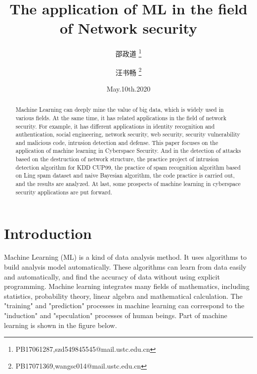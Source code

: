 \documentclass[UTF8]{article}
\title{ The application of ML in the field of Network security}
\author{邵政道 \footnote{PB17061287,szd549845545@mail.ustc.edu.cn} \and 汪书畅 \footnote{PB17071369,wangsc014@mail.ustc.edu.cn}}
\date{May.10th.2020}
\begin{document}
\maketitle{}

\begin{abstract}

	Machine Learning can deeply mine the value of big data, which is widely used in various fields. At the same time, it has related applications in the field of network security. For example, it has different applications in identity recognition and authentication, social engineering, network security, web security, security vulnerability and malicious code, intrusion detection and defense. This paper focuses on the application of machine learning in Cyberspace Security. And in the detection of attacks based on the destruction of network structure, the practice project of intrusion detection algorithm for KDD CUP99, the practice of spam recognition algorithm based on Ling spam dataset and naive Bayesian algorithm, the code practice is carried out, and the results are analyzed. At last, some prospects of machine learning in cyberspace security applications are put forward.

\end{abstract}

\section{Introduction}
	Machine Learning (ML) is a kind of data analysis method. It uses algorithms to build analysis model automatically. These algorithms can learn from data easily and automatically, and find the accuracy of data without using explicit programming.\cite{1} Machine learning integrates many fields of mathematics, including statistics, probability theory, linear algebra and mathematical calculation. The "training" and "prediction" processes in machine learning can correspond to the "induction" and "speculation" processes of human beings. Part of machine learning is shown in the figure below.
	
\end{document}

